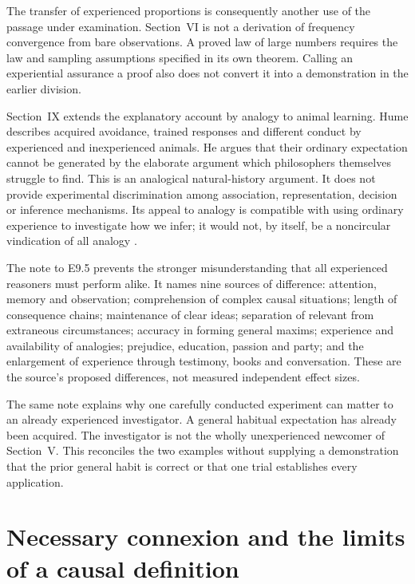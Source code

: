 The transfer of experienced proportions is consequently another use
of the passage under examination. Section~VI is not a derivation of
frequency convergence from bare observations. A proved law of large
numbers requires the law and sampling assumptions specified in its
own theorem. Calling an experiential assurance a proof also does not
convert it into a demonstration in the earlier division.

Section~IX extends the explanatory account by analogy to animal learning.
Hume describes acquired avoidance, trained responses and different
conduct by experienced and inexperienced animals. He argues that their
ordinary expectation cannot be generated by the elaborate argument
which philosophers themselves struggle to find. This is an analogical
natural-history argument. It does not provide experimental discrimination
among association, representation, decision or inference mechanisms.
Its appeal to analogy is compatible with using ordinary experience to
investigate how we infer; it would not, by itself, be a noncircular
vindication of all analogy \parencite[E~9.1--9.6]{Hume1777EnquiryHTO}.

The note to E9.5 prevents the stronger misunderstanding that all
experienced reasoners must perform alike. It names nine sources of
difference: attention, memory and observation; comprehension of complex
causal situations; length of consequence chains; maintenance of clear
ideas; separation of relevant from extraneous circumstances; accuracy
in forming general maxims; experience and availability of analogies;
prejudice, education, passion and party; and the enlargement of experience
through testimony, books and conversation. These are the source's
proposed differences, not measured independent effect sizes.

The same note explains why one carefully conducted experiment can matter
to an already experienced investigator. A general habitual expectation
has already been acquired. The investigator is not the wholly
unexperienced newcomer of Section~V. This reconciles the two examples
without supplying a demonstration that the prior general habit is
correct or that one trial establishes every application.

\section{Necessary connexion and the limits of a causal definition}
\label{sec:p15-hume-connexion}

